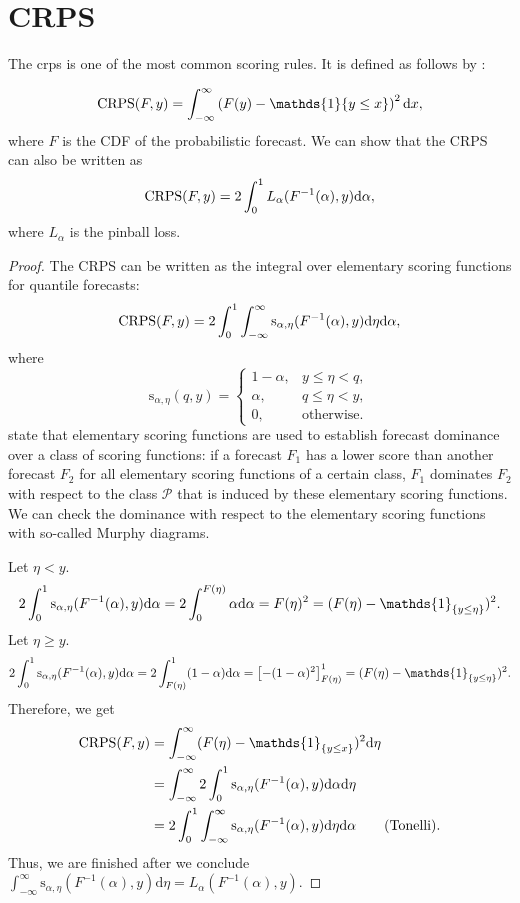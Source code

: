 \section{CRPS}
\label{ch:crps}

\renewcommand{\d}{\mathrm{d}}

The \gls{crps} is one of the most common 
scoring rules. It is defined as follows by \Textcite{Gneiting2014}: 

\[ \CRPS(F, y) = \int_{-\infty}^\infty \left( F(y) - \mathds{1} \{y \leq x\} \right)^2 \d x, \]
where \(F\) is the CDF of the probabilistic forecast.
We can show that the CRPS can also be written as 
\[ \CRPS(F, y) = 2 \int_0^1 L_\alpha(F^{-1}(\alpha), y) \d \alpha, \]
where \(L_\alpha\) is the pinball loss.
\begin{proof}
    The CRPS can be written as the integral over elementary scoring functions for quantile forecasts: 
    \[ \CRPS(F, y) = 2 \int_0^1 \int_{-\infty}^\infty \mathrm{s}_{\alpha, \eta}(F^{-1}(\alpha), y) \d \eta \d \alpha, \]
    where 
    \[ \mathrm{s}_{\alpha, \eta}(q, y) = \begin{cases}
        1-\alpha, &y\leq \eta < q, \\
        \alpha, &q\leq \eta < y, \\
        0, &\text{otherwise}.
    \end{cases} \]
    \Textcite{Ehm2016} state that elementary scoring functions are used to establish forecast 
    dominance over a class of scoring functions: if a forecast \(F_1\) has a lower score than 
    another forecast \(F_2\) for all elementary scoring functions of a certain class, 
    \(F_1\) dominates \(F_2\) with respect to the class \(\mathcal{P}\) 
    that is induced by these elementary scoring functions. We can check the dominance 
    with respect to the elementary scoring functions with so-called Murphy diagrams.

    Let \(\eta < y\). 
    \[ 2 \int_0^1 \mathrm{s}_{\alpha, \eta}(F^{-1}(\alpha), y) \d\alpha = 2 \int_0^{F(\eta)} \alpha \d \alpha = F(\eta)^2 = (F(\eta) - \mathds{1}_{\set{y \leq \eta}})^2. \]
    Let \(\eta \geq y\).
    \[ 2 \int_0^1 \mathrm{s}_{\alpha, \eta}(F^{-1}(\alpha), y) \d\alpha = 2 \int_{F(\eta)}^1 (1-\alpha) \d\alpha = \left[ - (1-\alpha)^2 \right]_{F(\eta)}^1 = (F(\eta) - \mathds{1}_{\set{y \leq \eta}})^2. \]
    Therefore, we get 
    \begin{align*}
        \CRPS(F, y) &= \int_{-\infty}^\infty (F(\eta) - \mathds{1}_{\set{y\leq x}})^2 \d \eta \\
        &= \int_{-\infty}^\infty 2 \int_0^1 \mathrm{s}_{\alpha, \eta}(F^{-1}(\alpha), y) \d \alpha \d \eta \\
        &= 2\int_0^1 \int_{-\infty}^\infty \mathrm{s}_{\alpha, \eta}(F^{-1}(\alpha), y) \d \eta \d \alpha  \tag{Tonelli}.
    \end{align*}
    Thus, we are finished after we conclude \(\int_{-\infty}^\infty \mathrm{s}_{\alpha, \eta}(F^{-1}(\alpha), y) \d \eta = L_\alpha(F^{-1}(\alpha), y)\).


\end{proof}
